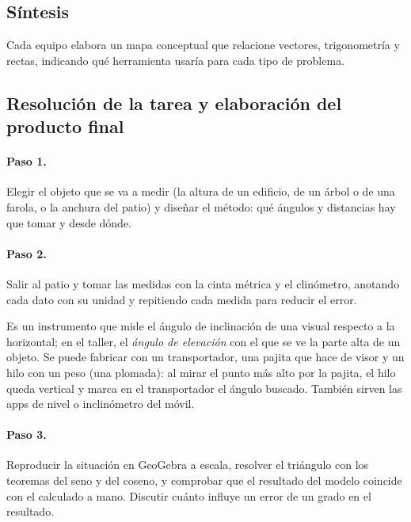 \documentclass[11pt,a4paper]{article}
\begin{document}
\subsection{Síntesis}
Cada equipo elabora un mapa conceptual que relacione vectores, trigonometría
y rectas, indicando qué herramienta usaría para cada tipo de problema.

\subsection{Resolución de la tarea y elaboración del producto final}
\paragraph{Paso 1.} Elegir el objeto que se va a medir (la altura de un
edificio, de un árbol o de una farola, o la anchura del patio) y diseñar el
método: qué ángulos y distancias hay que tomar y desde dónde.

\paragraph{Paso 2.} Salir al patio y tomar las medidas con la cinta métrica
y el clinómetro, anotando cada dato con su unidad y repitiendo cada medida
para reducir el error.

\begin{tcolorbox}[enhanced, colback=gris!6, colframe=gris!60, boxrule=0.6pt,
    arc=2pt, left=8pt, right=8pt, fonttitle=\bfseries\small,
    coltitle=gris!20!black, colbacktitle=gris!15, title=¿Qué es un clinómetro?]
  \small Es un instrumento que mide el ángulo de inclinación de una visual
  respecto a la horizontal; en el taller, el \emph{ángulo de elevación} con
  el que se ve la parte alta de un objeto. Se puede fabricar con un
  transportador, una pajita que hace de visor y un hilo con un peso (una
  plomada): al mirar el punto más alto por la pajita, el hilo queda vertical
  y marca en el transportador el ángulo buscado. También sirven las apps de
  nivel o inclinómetro del móvil.
\end{tcolorbox}

\paragraph{Paso 3.} Reproducir la situación en GeoGebra a escala, resolver
el triángulo con los teoremas del seno y del coseno, y comprobar que el
resultado del modelo coincide con el calculado a mano. Discutir cuánto
influye un error de un grado en el resultado.
\end{document}
